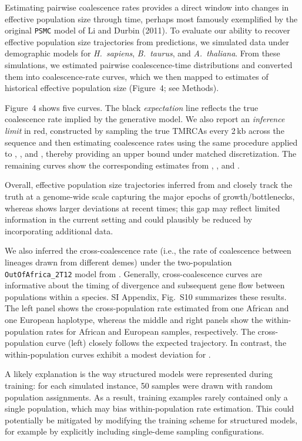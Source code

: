 \documentclass[9pt,twocolumn,twoside]{pnas-new}
\begin{document}
Estimating pairwise coalescence rates provides a direct window into changes in effective population size through time,
perhaps most famously exemplified by the original \texttt{PSMC} model of Li and Durbin (2011). 
To evaluate our ability to recover effective population size trajectories from \cxtkit predictions, 
we simulated data under demographic models for \emph{H.~sapiens}, \emph{B.~taurus}, and \emph{A.~thaliana}. From these simulations, we estimated pairwise coalescence-time distributions 
and converted them into coalescence-rate curves,
which we then mapped to estimates of historical effective population size (Figure~4; see Methods).

Figure~4 shows five curves.
The black \emph{expectation} line reflects the true coalescence rate implied by the generative model.
We also report an \emph{inference limit} in red, constructed by sampling the true TMRCAs every 2\,kb across the sequence
and then estimating coalescence rates using the same procedure applied to \cxtkit, \singer, and \smcpp,
thereby providing an upper bound under matched discretization.
The remaining curves show the corresponding estimates from \cxtkit, \singer, and \smcpp.

Overall, effective population size trajectories inferred from \cxtkit and \singer
closely track the truth at a genome-wide scale capturing the major epochs of growth/bottlenecks,
whereas \smcpp shows larger deviations at recent times;
this gap may reflect limited information in the current setting
and could plausibly be reduced by incorporating additional data.


We also inferred the cross-coalescence rate (i.e., the rate of coalescence between lineages drawn from different demes) 
under the two-population \texttt{OutOfAfrica\_2T12} model from \stdpopsim.
Generally, cross-coalescence curves are informative about the timing of divergence 
and subsequent gene flow between populations within a species.
SI Appendix, Fig.~S10 summarizes these results.
The left panel shows the cross-population rate estimated from one African and one European haplotype, 
whereas the middle  and right panels show the within-population rates for African and European samples, respectively.
The cross-population curve (left) closely follows the expected trajectory.
In contrast, the within-population curves exhibit a modest deviation for \cxtkit.

A likely explanation is the way structured models were represented during training:
for each simulated instance, 50 samples were drawn with random population assignments.
As a result, training examples rarely contained only a single population,
which may bias within-population rate estimation.
This could potentially be mitigated by modifying the training scheme for structured models,
for example by explicitly including single-deme sampling configurations.
\end{document}
